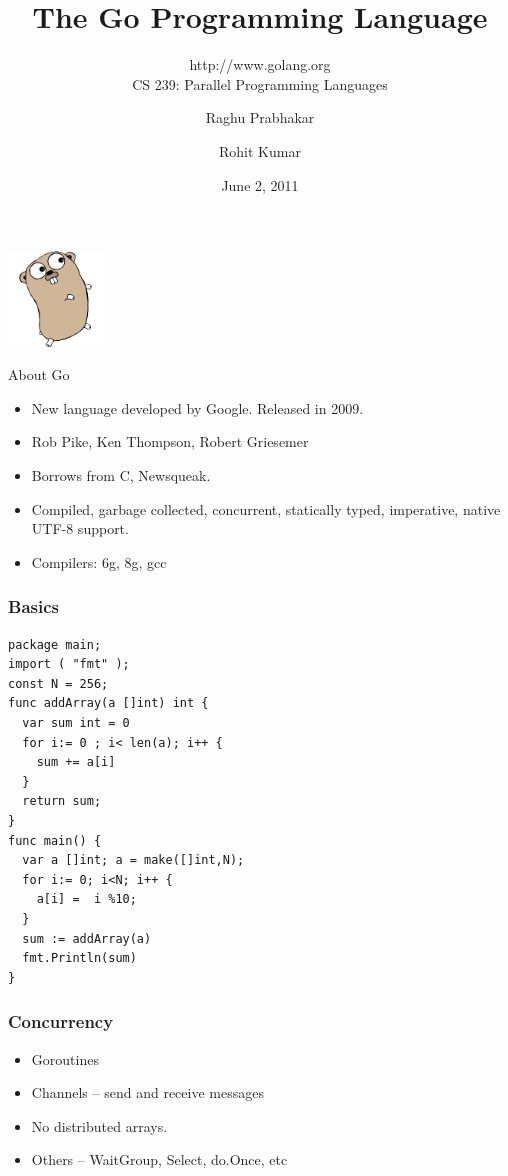 \documentclass{beamer}
\title{The Go Programming Language}
\subtitle{http://www.golang.org \\ CS 239: Parallel Programming Languages}
\author{Raghu Prabhakar \and Rohit Kumar}
\date{June 2, 2011}
\begin{document}
\begin{frame}
\begin{center}
\includegraphics[width=1in]{gopher.png}
\end{center}
\titlepage
\end{frame}

\begin{frame} {About Go}
\begin{itemize}
  \item New language developed by Google. Released in 2009.
  \item Rob Pike, Ken Thompson, Robert Griesemer
  \item Borrows from C, Newsqueak.
  \item Compiled, garbage collected, concurrent, statically typed,
    imperative, native UTF-8 support.
  \item Compilers: 6g, 8g, gcc 
\end{itemize}
\end{frame}

\begin{frame}[fragile]
\frametitle{Basics}
    {\small
\begin{verbatim}
package main;
import ( "fmt" );
const N = 256;
func addArray(a []int) int {
  var sum int = 0
  for i:= 0 ; i< len(a); i++ {
    sum += a[i]
  }
  return sum;
}
func main() {
  var a []int; a = make([]int,N);
  for i:= 0; i<N; i++ {
    a[i] =  i %10; 
  }
  sum := addArray(a)
  fmt.Println(sum) 
}		
\end{verbatim}
}
\end{frame}

\begin{frame}[fragile]
\frametitle{Concurrency}
  \begin{itemize}
    \item Goroutines
    \item Channels -- send and receive messages
    \item No distributed arrays. 
    \item Others -- WaitGroup, Select, do.Once, etc    
  \end{itemize}
\end{frame}
\end{document}

